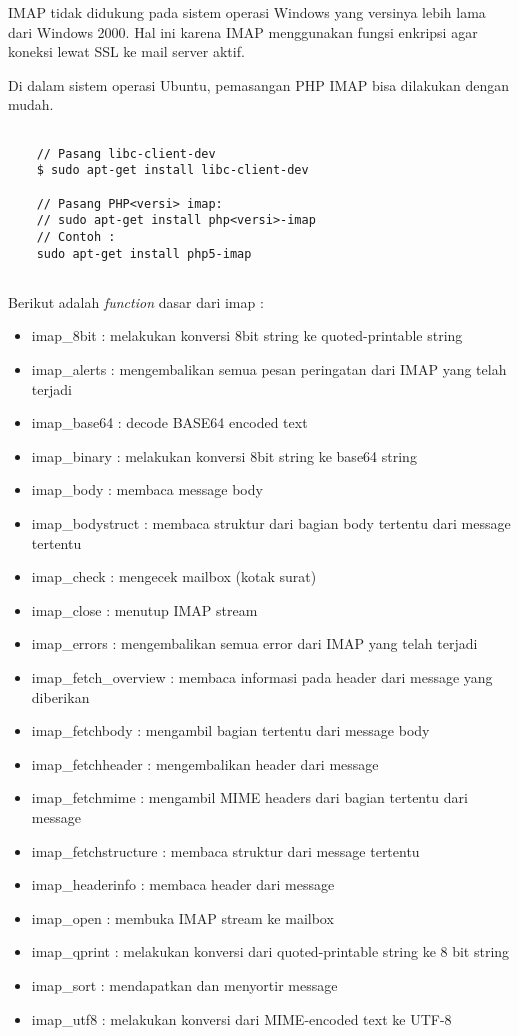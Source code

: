 IMAP tidak didukung pada sistem operasi Windows yang versinya lebih lama dari Windows 2000. Hal ini karena IMAP menggunakan fungsi enkripsi agar koneksi lewat SSL ke mail server aktif.

Di dalam sistem operasi Ubuntu, pemasangan PHP IMAP bisa dilakukan dengan mudah.
\begin{lstlisting}
	
	// Pasang libc-client-dev
	$ sudo apt-get install libc-client-dev

	// Pasang PHP<versi> imap:
	// sudo apt-get install php<versi>-imap
	// Contoh : 
	sudo apt-get install php5-imap
		
\end{lstlisting}

Berikut adalah \textit{function} dasar dari imap :
\begin{itemize}
\item imap\_8bit : melakukan konversi 8bit string ke quoted-printable string
\item imap\_alerts : mengembalikan semua pesan peringatan dari IMAP yang telah terjadi
\item imap\_base64 : decode BASE64 encoded text
\item imap\_binary : melakukan konversi 8bit string ke base64 string
\item imap\_body : membaca message body
\item imap\_bodystruct : membaca struktur dari bagian body tertentu dari message tertentu
\item imap\_check : mengecek mailbox (kotak surat)
\item imap\_close : menutup IMAP stream
\item imap\_errors : mengembalikan semua error dari IMAP yang telah terjadi
\item imap\_fetch\_overview : membaca informasi pada header dari message yang diberikan
\item imap\_fetchbody : mengambil bagian tertentu dari message body
\item imap\_fetchheader : mengembalikan header dari message
\item imap\_fetchmime : mengambil MIME headers dari bagian tertentu dari message
\item imap\_fetchstructure : membaca struktur dari message tertentu
\item imap\_headerinfo : membaca header dari message
\item imap\_open : membuka IMAP stream ke mailbox
\item imap\_qprint : melakukan konversi dari quoted-printable string ke 8 bit string
\item imap\_sort : mendapatkan dan menyortir message
\item imap\_utf8 : melakukan konversi dari MIME-encoded text ke UTF-8
\end{itemize}

